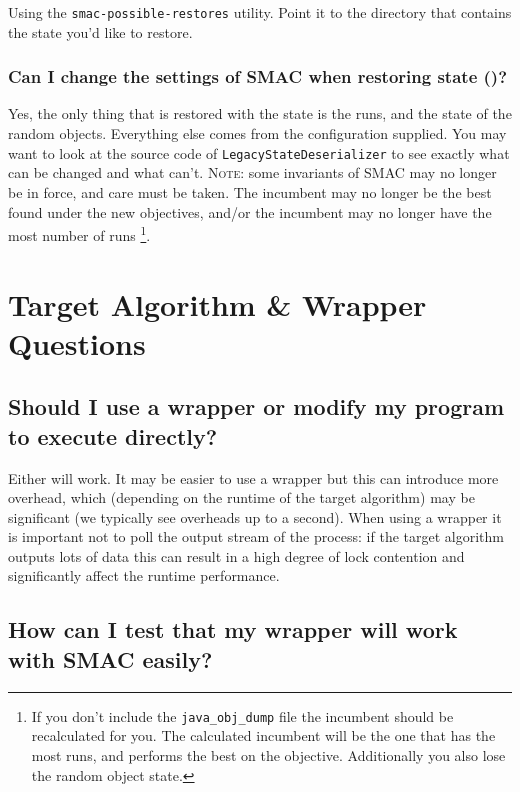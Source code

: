 \documentclass[11pt,letterpaper,oneside]{article}
\begin{document}
	Using the \texttt{smac-possible-restores} utility. Point it to the directory that contains the state you'd like to restore.

\subsubsection{Can I change the settings of SMAC when restoring state ()?}

	Yes, the only thing that is restored with the state is the runs, and the state of the random objects. Everything else comes from the configuration supplied. You may want to look at the source code of \texttt{LegacyStateDeserializer} to see exactly what can be changed and what can't. \textsc{Note:} some invariants of SMAC may no longer be in force, and care must be taken. The incumbent may no longer be the best found under the new objectives, and/or the incumbent may no longer have the most number of runs \footnote{If you don't include the \texttt{java\_obj\_dump} file the incumbent should be recalculated for you. The calculated incumbent will be the one that has the most runs, and performs the best on the objective. Additionally you also lose the random object state.}. 

\section{Target Algorithm \& Wrapper Questions}

\subsection{Should I use a wrapper or modify my program to execute directly?} 

	Either will work. It may be easier to use a wrapper but this can introduce more overhead, which (depending on the runtime of the target algorithm) may be significant (we typically see overheads up to a second). When using a wrapper it is important not to poll the output stream of the process: if the target algorithm outputs lots of data this can result in a high degree of lock contention and significantly affect the runtime performance.
	
\subsection{How can I test that my wrapper will work with SMAC easily?}
\label{sec:algotest}
\end{document}

